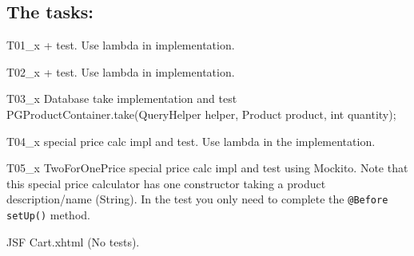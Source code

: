\subsection*{The tasks:}
\begin{description*}
\item[T01\_x]  + test. Use lambda in
  implementation. 
\item[T02\_x]  + test. Use lambda in implementation.
\item[T03\_x] Database take implementation and test PGProductContainer.take(QueryHelper helper, Product product, int quantity);
\item[T04\_x]  special price calc impl and test. Use
  lambda in the implementation.
\item[T05\_x] TwoForOnePrice special price calc impl and test using
  Mockito. Note that this special price calculator has one constructor
  taking a product description/name (String). In the test you only
  need to complete the \lstinline{@Before setUp()} method.
\item[T06\_x] JSF Cart.xhtml (No tests).
\end{description*}
